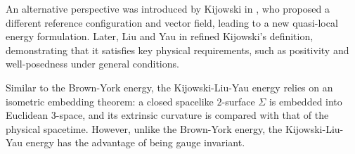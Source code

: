 \documentclass[12pt,a4paper]{amsart}
\theoremstyle{plain}
\theoremstyle{definition}
\begin{document}
An alternative perspective was introduced by Kijowski in \cite{kijowski1997simple}, who proposed a different reference configuration and vector field, leading to a new quasi-local energy formulation. Later, Liu and Yau in \cite{liu2003positivity} refined Kijowski’s definition, demonstrating that it satisfies key physical requirements, such as positivity and well-posedness under general conditions.

Similar to the Brown-York energy, the Kijowski-Liu-Yau energy relies on an isometric embedding theorem: a closed spacelike $2$-surface 
$\Sigma$ is embedded into Euclidean $3$-space, and its extrinsic curvature is compared with that of the physical spacetime. However, unlike the Brown-York energy, the Kijowski-Liu-Yau energy has the advantage of being gauge invariant.
\end{document}
